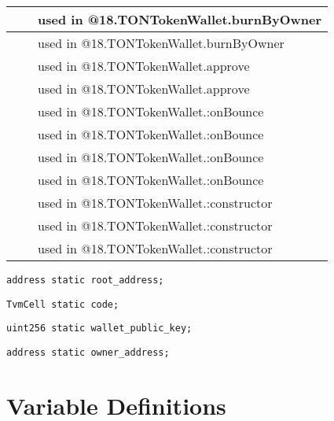 \begin{tabular}{|l|l|p{5cm}|}
 & & used in @18.TONTokenWallet.burnByOwner\\\hline
 & & used in @18.TONTokenWallet.burnByOwner\\\hline
 & & used in @18.TONTokenWallet.approve\\\hline
 & & used in @18.TONTokenWallet.approve\\\hline
 & & used in @18.TONTokenWallet.:onBounce\\\hline
 & & used in @18.TONTokenWallet.:onBounce\\\hline
 & & used in @18.TONTokenWallet.:onBounce\\\hline
 & & used in @18.TONTokenWallet.:onBounce\\\hline
 & & used in @18.TONTokenWallet.:constructor\\\hline
 & & used in @18.TONTokenWallet.:constructor\\\hline
 & & used in @18.TONTokenWallet.:constructor\\\hline
\end{tabular}
\fi


\begin{lstlisting}[firstnumber=24]
    address static root_address;
\end{lstlisting}

\begin{lstlisting}[firstnumber=25]
    TvmCell static code;
\end{lstlisting}

\begin{lstlisting}[firstnumber=27]
    uint256 static wallet_public_key;
\end{lstlisting}

\begin{lstlisting}[firstnumber=29]
    address static owner_address;
\end{lstlisting}

\section{Variable Definitions}


